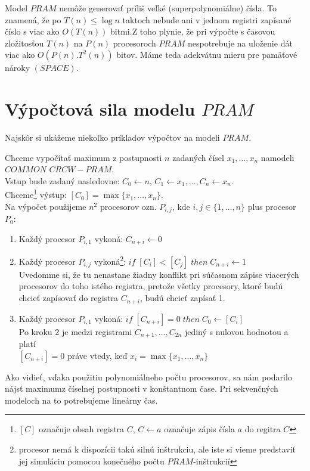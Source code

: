Model $PRAM$ nemôže generovať príliš veľké (superpolynomiálne)
čísla. To znamená, že po $T(n)\leq \log n$ taktoch nebude ani v
jednom registri zapísané číslo s viac ako $O(T(n))$
bitmi.\linebreak Z toho plynie, že pri výpočte s časovou
zložitosťou $T(n)$ na $P(n)$ procesoroch $PRAM$ nespotrebuje na
uloženie dát viac ako $O(P(n).T^2(n))$ bitov. Máme teda adekvátnu
mieru pre pamäťové nároky $(SPACE)$.

\section{Výpočtová sila modelu $PRAM$}

Najskôr si ukážeme niekoľko príkladov výpočtov na modeli $PRAM$.

\begin{priklad}
  Chceme vypočítať maximum z postupnosti $n$ zadaných čísel
  $x_1,\dots ,x_n$ na\linebreak modeli $COMMON$ $CRCW-PRAM$.
  \\ Vstup bude zadaný nasledovne: $C_0\leftarrow n$, $C_1\leftarrow
  x_1,\dots ,C_n\leftarrow x_n$.
  \\ Chceme\footnote{$[C]$ označuje obsah registra $C$, $C\leftarrow
  a$ označuje zápis čísla $a$ do regitra $C$} výstup: $[C_0]=\max \{
  x_1,\dots ,x_n\}$.
  \\ Na výpočet použijeme $n^2$ procesorov ozn. $P_{i,j}$, kde
  $i,j\in\{ 1,\dots ,n\}$ plus procesor $P_0$:
  \begin{enumerate}
    \item Každý procesor $P_{i,1}$ vykoná: $C_{n+i}\leftarrow 0$
    \item Každý procesor $P_{i,j}$ vykoná\footnote{procesor nemá k dispozícii
    takú silnú inštrukciu, ale iste si vieme predstaviť jej simuláciu pomocou konečného
    počtu $PRAM$-inštrukcií}: $if\; [C_i]<[C_j]\; then\; C_{n+i}\leftarrow 1$
    \\ Uvedomme si, že tu nenastane žiadny konflikt pri súčasnom
    zápise viacerých procesorov do toho istého registra, pretože
    všetky procesory, ktoré budú chcieť zapísovať do registra
    $C_{n+i}$, budú chcieť zapísať 1.
    \item Každý procesor $P_{i,1}$ vykoná: $if\; [C_{n+i}]=0\;
    then\; C_0\leftarrow [C_i]$
    \\ Po kroku 2 je medzi registrami $C_{n+1},\dots ,C_{2n}$ jediný
    s nulovou hodnotou a platí
    \\ $[C_{n+i}]=0$ práve vtedy, keď $x_i=\max\{x_1,\dots ,x_n\}$
  \end{enumerate}
  Ako vidieť, vďaka použitiu polynomiálneho počtu procesorov, sa nám
  podarilo nájsť maximum\linebreak z číselnej postupnosti v
  konštantnom čase. Pri sekvenčných modeloch na to potrebujeme
  lineárny čas.
\end{priklad}

